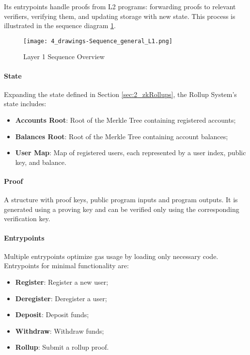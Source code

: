 Its entrypoints handle proofs from L2 programs: forwarding proofs to relevant verifiers, verifying them, and updating storage with new state. This process is illustrated in the sequence diagram \ref{fig:Layer1sequencediagram}.

\begin{figure}[ht]
  \centering
  \texttt{[image: 4\_drawings-Sequence\_general\_L1.png]}
  \caption{Layer 1 Sequence Overview}
  \label{fig:Layer1sequencediagram}
\end{figure}

\paragraph{State}
Expanding the state defined in Section \ref{sec:2_zkRollups}, the Rollup System's state includes:
\begin{itemize}
  \item \textbf{Accounts Root}: Root of the Merkle Tree containing registered accounts;
  \item \textbf{Balances Root}: Root of the Merkle Tree containing account balances;
  \item \textbf{User Map}: Map of registered users, each represented by a user index, public key, and balance.
\end{itemize}

\paragraph{Proof}
A structure with proof keys, public program inputs and program outputs. It is generated using a proving key and can be verified only using the corresponding verification key.

\paragraph{Entrypoints}
Multiple entrypoints optimize gas usage by loading only necessary code. Entrypoints for minimal functionality are:
\begin{itemize}
  \item \textbf{Register}: Register a new user;
  \item \textbf{Deregister}: Deregister a user;
  \item \textbf{Deposit}: Deposit funds;
  \item \textbf{Withdraw}: Withdraw funds;
  \item \textbf{Rollup}: Submit a rollup proof.
\end{itemize}

